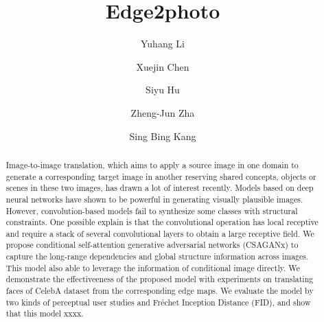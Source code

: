 \documentclass[format=acmsmall, review=false, screen=true]{acmart}
\begin{document}
\title[Edge2photo]{Edge2photo}

\author{Yuhang Li}
%
%
\author{Xuejin Chen}
%
%
\author{Siyu Hu}
%
%
\author{Zheng-Jun Zha}
%
%
\author{Sing Bing Kang}

\begin{abstract}
Image-to-image translation, which aims to apply a source image in one domain to generate a corresponding target image in another reserving shared concepts, objects or scenes in these two images, has drawn a lot of interest recently. Models based on deep neural networks have shown to be powerful in generating visually plausible images. However, convolution-based models fail to synthesize some classes with structural constraints. One possible explain is that the convolutional operation has local receptive and require a stack of several convolutional layers to obtain a large receptive field. We propose conditional self-attention generative adversarial networks (CSAGANx) to capture the long-range dependencies and global structure information across images. This model also able to leverage the information of conditional image directly. We demonstrate the effectiveeness of the proposed model with experiments on translating faces of CelebA dataset from the corresponding edge maps. We evaluate the model by two kinds of perceptual user studies and Fr\'echet Inception Distance (FID), and show that this model xxxx.
\end{abstract}
\end{document}
